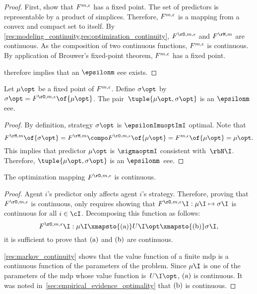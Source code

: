 \begin{proof}
First, show that \(F^{m, \epsilon}\) has a fixed point.
The set of predictors is representable by a product of simplices.
Therefore, \(F^{m, \epsilon}\) is a mapping from a convex and compact set to itself.
By \cref{res:modeling_continuity,res:optimization_continuity}, \(\FO\) and \(\FM\) are continuous.
As the composition of two continuous functions, \(F^{m, \epsilon}\) is continuous.
By application of Brouwer's fixed-point theorem, \(F^{m, \epsilon}\) has a fixed point.

 therefore implies that an \(\epsilonm\) \ac{eee} exists.
\end{proof}

\begin{proposition}
\label{res:fixed_point_EEE}
Let \(\mu\opt\) be a fixed point of \(F^{m, \epsilon}\).
Define \(\sigma\opt\) by \(\sigma\opt = \FO \of{\mu\opt}\).
The pair~\(\tuple{\mu\opt, \sigma\opt}\) is an \(\epsilonm\) \ac{eee}.
\end{proposition}

\begin{proof}
By definition, strategy \(\sigma\opt\) is \(\epsilonImuoptImI\) optimal.
Note that
\[\FM \of{\sigma\opt} = \FM \compo \FO \of{\mu\opt} = \FF \of{\mu\opt} = \mu\opt.
\]
This implies that predictor \(\mu\opt\) is \(\sigmaoptmI\) consistent with~\(\rbN\I\).
Therefore, \(\tuple{\mu\opt, \sigma\opt}\) is an \(\epsilonm\)~\ac{eee}.
\end{proof}

\begin{proposition}
\label{res:optimization_continuity}
The optimization mapping \(\FO\) is continuous.
\end{proposition}

\begin{proof}
Agent \(i\)'s predictor only affects agent \(i\)'s strategy.
Therefore, proving that \(\FO\) is continuous, only requires showing that \(\FO\I: \mu\I \mapsto \sigma\I\) is continuous for all \(i \in \cI\).
Decomposing this function as follows:
\[
\FO\I: \mu\I \xmapsto{\subfunc{a}} U\I\opt \xmapsto{\subfunc{b}} \sigma\I,
\]
it is sufficient to prove that \(\mathrm{(a)}\) and \(\mathrm{(b)}\) are continuous.

\cref{res:markov_continuity} shows that the value function of a finite \ac{mdp} is a continuous function of the parameters of the problem.
Since \(\mu\I\) is one of the parameters of the \ac{mdp} whose value function is~\(U\I\opt\), \(\mathrm{(a)}\) is continuous.
It was noted in~\cref{sec:empirical_evidence_optimality} that \(\mathrm{(b)}\) is continuous.
\end{proof}

